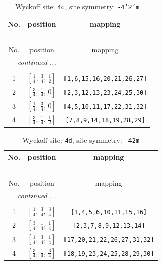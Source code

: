 \documentclass[fleqn,8pt]{jsarticle}
\begin{document}
\renewcommand{\arraystretch}{1.2}
\begin{longtable}{ccc}
\caption{Wyckoff site: {\tt 4c}, site symmetry: {\tt -4'2'm}}
 \\
 \hline \hline
No. & position & mapping \\ \hline \endfirsthead

\multicolumn{2}{l}{\tablename\ \thetable{}} \\
 \hline \hline
No. & position & mapping \\ \hline \endhead

 \hline \hline
\multicolumn{2}{r}{\footnotesize\it continued ...} \\ \endfoot

 \hline \hline
\multicolumn{2}{r}{} \\ \endlastfoot

1 & $\left[ \frac{1}{4},\, \frac{3}{4},\, \frac{1}{2} \right]$ & {\tt [1,6,15,16,20,21,26,27]} \\ \hline
2 & $\left[ \frac{3}{4},\, \frac{1}{4},\, 0 \right]$ & {\tt [2,3,12,13,23,24,25,30]} \\ \hline
3 & $\left[ \frac{1}{4},\, \frac{3}{4},\, 0 \right]$ & {\tt [4,5,10,11,17,22,31,32]} \\ \hline
4 & $\left[ \frac{3}{4},\, \frac{1}{4},\, \frac{1}{2} \right]$ & {\tt [7,8,9,14,18,19,28,29]} \\
\end{longtable}
\renewcommand{\arraystretch}{1.2}
\begin{longtable}{ccc}
\caption{Wyckoff site: {\tt 4d}, site symmetry: {\tt -42m}}
 \\
 \hline \hline
No. & position & mapping \\ \hline \endfirsthead

\multicolumn{2}{l}{\tablename\ \thetable{}} \\
 \hline \hline
No. & position & mapping \\ \hline \endhead

 \hline \hline
\multicolumn{2}{r}{\footnotesize\it continued ...} \\ \endfoot

 \hline \hline
\multicolumn{2}{r}{} \\ \endlastfoot

1 & $\left[ \frac{1}{4},\, \frac{3}{4},\, \frac{3}{4} \right]$ & {\tt [1,4,5,6,10,11,15,16]} \\ \hline
2 & $\left[ \frac{3}{4},\, \frac{1}{4},\, \frac{1}{4} \right]$ & {\tt [2,3,7,8,9,12,13,14]} \\ \hline
3 & $\left[ \frac{1}{4},\, \frac{3}{4},\, \frac{1}{4} \right]$ & {\tt [17,20,21,22,26,27,31,32]} \\ \hline
4 & $\left[ \frac{3}{4},\, \frac{1}{4},\, \frac{3}{4} \right]$ & {\tt [18,19,23,24,25,28,29,30]} \\
\end{longtable}
\end{document}
